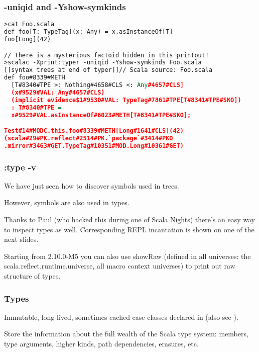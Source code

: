 \documentclass[hyperref={bookmarks=false}]{beamer}
\begin{document}
\begin{frame}[fragile]
\frametitle{-uniqid and -Yshow-symkinds}

\begin{lstlisting}[language=XML]
>cat Foo.scala
def foo[T: TypeTag](x: Any) = x.asInstanceOf[T]
foo[Long](42)

// there is a mysterious factoid hidden in this printout!
>scalac -Xprint:typer -uniqid -Yshow-symkinds Foo.scala
[[syntax trees at end of typer]]// Scala source: Foo.scala
def foo#8339#METH
  [T#8340#TPE >: Nothing#4658#CLS <: Any#4657#CLS]
  (x#9529#VAL: Any#4657#CLS)
  (implicit evidence$1#9530#VAL: TypeTag#7861#TPE[T#8341#TPE#SKO])
  : T#8340#TPE =
  x#9529#VAL.asInstanceOf#6023#METH[T#8341#TPE#SKO];

Test#14#MODC.this.foo#8339#METH[Long#1641#CLS](42)
(scala#29#PK.reflect#2514#PK.`package`#3414#PKO
.mirror#3463#GET.TypeTag#10351#MOD.Long#10361#GET)
\end{lstlisting}

\end{frame}

\begin{frame}[fragile]
\frametitle{:type -v}

We have just seen how to discover symbols used in trees.

However, symbols are also used in types.

Thanks to Paul (who hacked this during one of Scala Nights)
there's an easy way to inspect types as well.
Corresponding REPL incantation is shown on one of the next slides.

Starting from 2.10.0-M5 you can also use showRaw (defined in all universes:
the scala.reflect.runtime.universe, all macro context universes)
to print out raw structure of types.

\end{frame}

\begin{frame}[fragile]
\frametitle{Types}

Immutable, long-lived, sometimes cached case classes declared in 
(also see ).

Store the information about the full wealth of the Scala type system:
members, type arguments, higher kinds, path dependencies, erasures, etc.

\end{frame}
\end{document}

